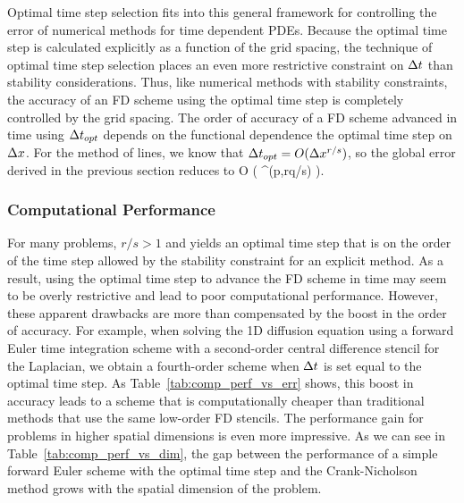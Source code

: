 \documentclass[oneeqnum,onefignum,onetabnum,onethmnum]{siamltex}
\begin{document}
Optimal time step selection fits into this general framework for controlling
the error of numerical methods for time dependent PDEs.  Because the optimal 
time step is calculated explicitly as a function of the grid spacing, the 
technique of optimal time step selection places an even more restrictive 
constraint on $\Delta t$ than stability considerations.  Thus, like numerical
methods with stability constraints, the accuracy of an FD scheme using 
the optimal time step is completely controlled by the grid spacing.  The 
order of accuracy of a FD scheme advanced in time using $\Delta t_{opt}$ 
depends on the functional dependence the optimal time step on $\Delta x$.
For the method of lines, we know that $\Delta t_{opt} = O(\Delta x^{r/s})$, 
so the global error derived in the previous section reduces to 
\beq
O \left( \dx^{\min(p,rq/s)} \right).
\label{eq:global_error_ots_simplified}
\eeq


\subsubsection*{\label{sec:computational_performance} 
                Computational Performance}
For many problems, $r/s > 1$ and yields an optimal time step that is on the 
order of the time step allowed by the stability constraint for an explicit 
method.  As a result, using the optimal time step to advance the FD scheme in 
time may seem to be overly restrictive and lead to poor computational 
performance.  However, these apparent drawbacks are more than compensated by 
the boost in the order of accuracy.  For example, when solving the 1D 
diffusion equation using a forward Euler time integration scheme with a 
second-order central difference stencil for the Laplacian, we obtain a 
fourth-order scheme when $\Delta t$ is set equal to the optimal time step.  As
Table~\ref{tab:comp_perf_vs_err} shows, this boost in accuracy leads to a
scheme that is computationally cheaper than traditional methods that use 
the same low-order FD stencils.  The performance gain for problems in higher 
spatial dimensions is even more impressive.  As we can see in 
Table~\ref{tab:comp_perf_vs_dim}, the gap between the performance of a
simple forward Euler scheme with the optimal time step and the Crank-Nicholson
method grows with the spatial dimension of the problem.  
\end{document}
